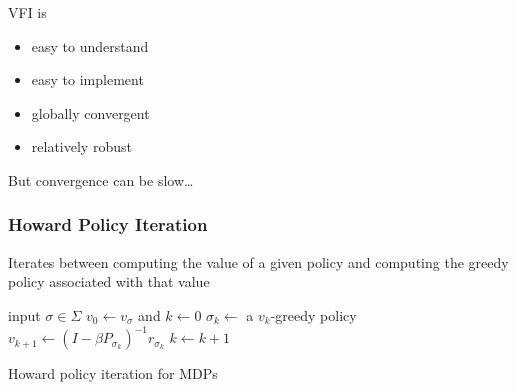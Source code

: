 \documentclass[xcolor=dvipsnames]{beamer}
\newcommand{\1}{\mathbbm 1}
\begin{document}
\begin{frame}
    

    VFI is 
    \begin{itemize}
        \vspace{0.5em}
        \item easy to understand
        \vspace{0.5em}
        \item easy to implement 
        \vspace{0.5em}
        \item globally convergent
        \vspace{0.5em}
        \item relatively robust
    \end{itemize}

    \vspace{0.5em}
    \vspace{0.5em}
    \vspace{0.5em}
    \vspace{0.5em}
    But convergence can be slow\ldots

\end{frame}


\begin{frame}
    \frametitle{Howard Policy Iteration}

    \begin{figure}
       \begin{center}
           \scalebox{0.7}{}
        \vspace{1em}
       \end{center}
    \end{figure}

    Iterates between computing the value of a given policy
    and computing the greedy policy associated with that value

\end{frame}

\begin{frame}
        
    {\small
    \begin{algorithm}[H]
        \DontPrintSemicolon
        input $\sigma \in \Sigma$ \;
        $v_0 \leftarrow v_\sigma$ and $k \leftarrow 0$  \;
        \Repeat
        {
            $\sigma_k \leftarrow $ a $v_k$-greedy policy \;
            $v_{k+1} \leftarrow (I - \beta P_{\sigma_k} )^{-1} r_{\sigma_k}$ \;
            $k \leftarrow k + 1$ \;
        }
        \caption{\label{algo:fshpi} Howard policy iteration for MDPs}
    \end{algorithm}
    }

\end{frame}
\end{document}
